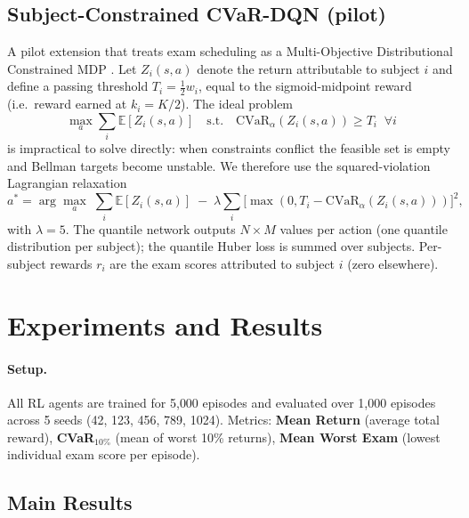 \documentclass[a4paper,11pt]{article}
\theoremstyle{definition}
\begin{document}
\subsection{Subject-Constrained CVaR-DQN (pilot)}
\label{sec:sc_cvar_dqn}

A pilot extension that treats exam scheduling as a Multi-Objective Distributional Constrained MDP \citep{altman1999,achiam2017}. Let $Z_i(s, a)$ denote the return attributable to subject $i$ and define a passing threshold $T_i = \tfrac{1}{2} w_i$, equal to the sigmoid-midpoint reward (i.e.\ reward earned at $k_i = K/2$). The ideal problem
\[
\max_a \sum_i \mathbb{E}[Z_i(s, a)] \quad \text{s.t.} \quad \mathrm{CVaR}_\alpha(Z_i(s, a)) \geq T_i \;\; \forall i
\]
is impractical to solve directly: when constraints conflict the feasible set is empty and Bellman targets become unstable. We therefore use the squared-violation Lagrangian relaxation
\begin{equation}
    a^* = \arg\max_a \; \sum_i \mathbb{E}[Z_i(s, a)] \; - \; \lambda \sum_i \bigl[\max(0, T_i - \mathrm{CVaR}_\alpha(Z_i(s, a)))\bigr]^2,
    \label{eq:sc_cvar_lagrangian}
\end{equation}
with $\lambda = 5$. The quantile network outputs $N \times M$ values per action (one quantile distribution per subject); the quantile Huber loss is summed over subjects. Per-subject rewards $r_i$ are the exam scores attributed to subject $i$ (zero elsewhere).

\section{Experiments and Results}
\label{sec:experiments}

\paragraph{Setup.} All RL agents are trained for 5{,}000 episodes and evaluated over 1{,}000 episodes across 5 seeds (42, 123, 456, 789, 1024). Metrics: \textbf{Mean Return} (average total reward), \textbf{CVaR$_{10\%}$} (mean of worst 10\% returns), \textbf{Mean Worst Exam} (lowest individual exam score per episode).

\subsection{Main Results}
\end{document}
